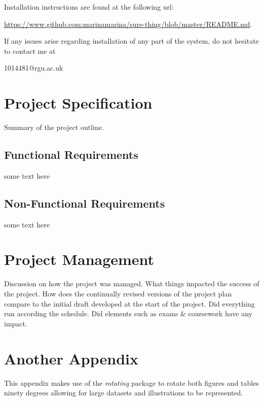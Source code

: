 Installation instructions are found at the following url:

\url{https://www.github.com:marinamarina/sure-thing/blob/master/README.md}.


If any issues arise regarding installation of any part of the
system, do not hesitate to contact me at 

1014481@rgu.ac.uk

\chapter{Project Specification}
Summary of the project outline.

\section{Functional Requirements}
some text here

\section{Non-Functional Requirements}
some text here

\chapter{Project Management}
Discussion on how the project was managed. What things impacted the success of the project. How does the continually revised versions of the project plan compare to the initial draft developed at the start of the project. Did everything run according the schedule. Did elements such as exams \& coursework have any impact. 


\chapter{Another Appendix}

This appendix makes use of the \emph{rotating} package to rotate both figures and tables ninety degrees allowing for large datasets and illustrations to be represented.

